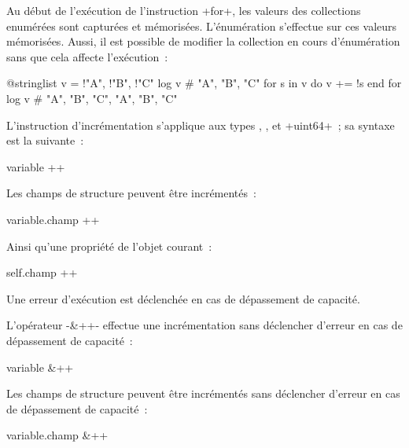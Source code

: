 Au début de l'exécution de l'instruction \ggs+for+, les valeurs des collections enumérées sont capturées et mémorisées. L'énumération s'effectue sur ces valeurs mémorisées. Aussi, il est possible de modifier la collection en cours d'énumération sans que cela affecte l'exécution~:
\begin{galgas}
@stringlist v = {!"A", !"B", !"C"}
log v # "A", "B", "C"
for s in v do
  v += !s
end for
log v # "A", "B", "C", "A", "B", "C"
\end{galgas}





















L'instruction d'incrémentation s'applique aux types  ,  ,  et \ggs+uint64+~; sa syntaxe est la suivante~:

\begin{galgasbox}
variable ++
\end{galgasbox}

Les champs de structure peuvent être incrémentés~:
\begin{galgasbox}
variable.champ ++
\end{galgasbox}


Ainsi qu'une propriété de l'objet courant~:
\begin{galgasbox}
self.champ ++
\end{galgasbox}

Une erreur d'exécution est déclenchée en cas de dépassement de capacité.

L'opérateur \ggs-&++- effectue une incrémentation sans déclencher d'erreur en cas de dépassement de capacité~:
\begin{galgasbox}
variable &++
\end{galgasbox}

Les champs de structure peuvent être incrémentés sans déclencher d'erreur en cas de dépassement de capacité~:
\begin{galgasbox}
variable.champ &++
\end{galgasbox}








